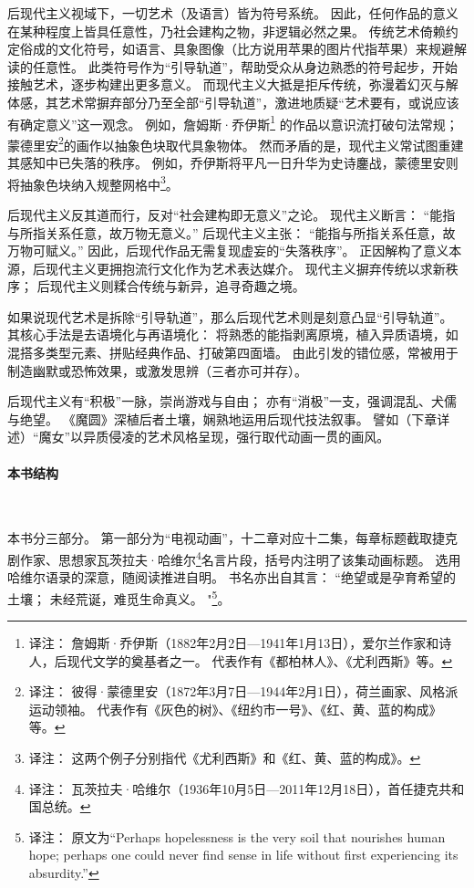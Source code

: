 后现代主义视域下，一切艺术（及语言）皆为符号系统。
因此，任何作品的意义在某种程度上皆具任意性，乃社会建构之物，非逻辑必然之果。
传统艺术倚赖约定俗成的文化符号，如语言、具象图像（比方说用苹果的图片代指苹果）来规避解读的任意性。
此类符号作为“引导轨道”，帮助受众从身边熟悉的符号起步，开始接触艺术，逐步构建出更多意义。
而现代主义大抵是拒斥传统，弥漫着幻灭与解体感，其艺术常摒弃部分乃至全部“引导轨道”，激进地质疑“艺术要有，或说应该有确定意义”这一观念。
例如，詹姆斯·乔伊斯\footnote{%
    译注：
    詹姆斯·乔伊斯（1882年2月2日—1941年1月13日），爱尔兰作家和诗人，后现代文学的奠基者之一。
    代表作有《都柏林人》、《尤利西斯》等。
} 的作品以意识流打破句法常规；
蒙德里安\footnote{%
    译注：
    彼得·蒙德里安（1872年3月7日—1944年2月1日），荷兰画家、风格派运动领袖。
    代表作有《灰色的树》、《纽约市一号》、《红、黄、蓝的构成》等。
}的画作以抽象色块取代具象物体。
然而矛盾的是，现代主义常试图重建其感知中已失落的秩序\cite{ref3}。
例如，乔伊斯将平凡一日升华为史诗鏖战，蒙德里安则将抽象色块纳入规整网格中\footnote{%
    译注：
    这两个例子分别指代《尤利西斯》和《红、黄、蓝的构成》。
}。

后现代主义反其道而行，反对“社会建构即无意义”之论。
现代主义断言：
“能指与所指关系任意，故万物无意义。”
后现代主义主张：
“能指与所指关系任意，故万物可赋义。”
因此，后现代作品无需复现虚妄的“失落秩序”。
正因解构了意义本源，后现代主义更拥抱流行文化作为艺术表达媒介\cite{ref4}。
现代主义摒弃传统以求新秩序；
后现代主义则糅合传统与新异，追寻奇趣之境\cite{ref5}。

如果说现代艺术是拆除“引导轨道”，那么后现代艺术则是刻意凸显“引导轨道”。
其核心手法是去语境化与再语境化：
将熟悉的能指剥离原境，植入异质语境，如混搭多类型元素、拼贴经典作品、打破第四面墙\cite{ref5}。
由此引发的错位感，常被用于制造幽默或恐怖效果，或激发思辨（三者亦可并存）。

后现代主义有“积极”一脉，崇尚游戏与自由；
亦有“消极”一支，强调混乱、犬儒与绝望\cite{ref6}。
《魔圆》深植后者土壤，娴熟地运用后现代技法叙事。
譬如（下章详述）“魔女”以异质侵凌的艺术风格呈现，强行取代动画一贯的画风。
\paragraph{本书结构}~{}

本书分三部分。
第一部分为“电视动画”，十二章对应十二集，每章标题截取捷克剧作家、思想家瓦茨拉夫·哈维尔\footnote{%
    译注：
    瓦茨拉夫·哈维尔（1936年10月5日—2011年12月18日），首任捷克共和国总统。
}名言片段，括号内注明了该集动画标题。
选用哈维尔语录的深意，随阅读推进自明。
书名亦出自其言：
``绝望或是孕育希望的土壤；
未经荒诞，难觅生命真义。
"\footnote{%
    译注：
    原文为``Perhaps hopelessness is the very soil that nourishes human hope;
    perhaps one could never find sense in life without first experiencing its absurdity.''
}\cite{ref7}。

